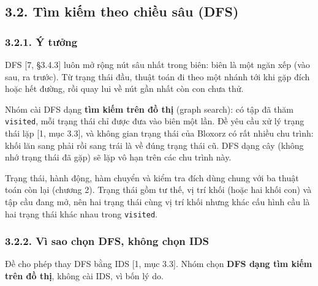 \subsection{3.2. Tìm kiếm theo chiều sâu (DFS)}

\subsubsection{3.2.1. Ý tưởng}

DFS {[}7, §3.4.3{]} luôn mở rộng nút sâu nhất trong biên: biên là một ngăn xếp (vào sau, ra trước). Từ trạng thái đầu, thuật toán đi theo một nhánh tới khi gặp đích hoặc hết đường, rồi quay lui về nút gần nhất còn con chưa thử.

Nhóm cài DFS dạng \textbf{tìm kiếm trên đồ thị} (graph search): có tập đã thăm \texttt{visited}, mỗi trạng thái chỉ được đưa vào biên một lần. Đề yêu cầu xử lý trạng thái lặp {[}1, mục 3.3{]}, và không gian trạng thái của Bloxorz có rất nhiều chu trình: khối lăn sang phải rồi sang trái là về đúng trạng thái cũ. DFS dạng cây (không nhớ trạng thái đã gặp) sẽ lặp vô hạn trên các chu trình này.

Trạng thái, hành động, hàm chuyển và kiểm tra đích dùng chung với ba thuật toán còn lại (chương 2). Trạng thái gồm tư thế, vị trí khối (hoặc hai khối con) và tập cầu đang mở, nên hai trạng thái cùng vị trí khối nhưng khác cấu hình cầu là hai trạng thái khác nhau trong \texttt{visited}.

\subsubsection{3.2.2. Vì sao chọn DFS, không chọn IDS}

Đề cho phép thay DFS bằng IDS {[}1, mục 3.3{]}. Nhóm chọn \textbf{DFS dạng tìm kiếm trên đồ thị}, không cài IDS, vì bốn lý do.

